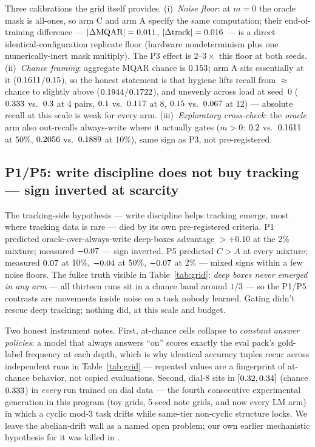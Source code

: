 \documentclass[10pt]{article}
\begin{document}
Three calibrations the grid itself provides. (i)~\emph{Noise floor}: at $m{=}0$ the oracle mask is
all-ones, so arm C and arm A specify the same computation; their end-of-training difference ---
$|\Delta\text{MQAR}|=0.011$, $|\Delta\text{track}|=0.016$ --- is a direct
identical-configuration replicate floor (hardware nondeterminism plus one numerically-inert mask
multiply). The P3 effect is $2$--$3\times$ this floor at both seeds. (ii)~\emph{Chance framing}:
aggregate MQAR chance is $0.153$; arm A sits essentially at it
($0.1611$/$0.15$), so the honest statement is that hygiene lifts recall from
$\approx$chance to slightly above ($0.1944$/$0.1722$), and unevenly across load at
seed~0 ($0.333$ vs.\ $0.3$ at 4 pairs, $0.1$ vs.\
$0.117$ at 8, $0.15$ vs.\ $0.067$ at 12) --- absolute
recall at this scale is weak for every arm. (iii)~\emph{Exploratory cross-check}: the \emph{oracle} arm also out-recalls always-write
where it actually gates ($m{>}0$: $0.2$ vs.\ $0.1611$ at 50\%,
$0.2056$ vs.\ $0.1889$ at 10\%), same sign as P3, not pre-registered.

\subsection{P1/P5: write discipline does not buy tracking --- sign inverted at scarcity}\label{sec:tracking}
The tracking-side hypothesis --- write discipline helps tracking emerge, most where tracking data is
rare --- died by its own pre-registered criteria. P1 predicted oracle-over-always-write deep-boxes
advantage $>+0.10$ at the 2\% mixture; measured $-0.07$ --- sign inverted. P5 predicted
$C>A$ at every mixture; measured $0.07$ at 10\%, $-0.04$ at 50\%,
$-0.07$ at 2\% --- mixed signs within a few noise floors. The fuller truth visible in
Table~\ref{tab:grid}: \emph{deep boxes never emerged in any arm} --- all thirteen runs sit in a
chance band around $1/3$ --- so the P1/P5 contrasts are movements inside noise on a task nobody
learned. Gating didn't rescue deep tracking; nothing did, at this scale and budget.

Two honest instrument notes. First, at-chance cells collapse to \emph{constant answer policies}:
a model that always answers ``on'' scores exactly the eval pack's gold-label frequency at each
depth, which is why identical accuracy tuples recur across independent runs in
Table~\ref{tab:grid} --- repeated values are a fingerprint of at-chance behavior, not copied
evaluations. Second, dial-8 sits in $[0.32,0.34]$ (chance $0.333$) in
\emph{every} run trained on dial data --- the fourth consecutive experimental generation in this
program (toy grids, 5-seed note grids, and now every LM arm) in which a cyclic mod-3 task drifts
while same-tier non-cyclic structure locks. We leave the abelian-drift wall as a named open problem;
our own earlier mechanistic hypothesis for it was killed in \citet{howe2026automaton}.
\end{document}
